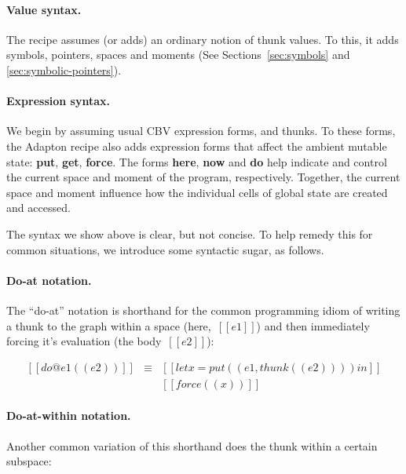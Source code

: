 \documentclass[11pt]{article}
\begin{document}
\paragraph{Value syntax.}
The recipe assumes (or adds) an ordinary notion of thunk values.
%
To this, it adds symbols, pointers, spaces and moments (See Sections~\ref{sec:symbols} and \ref{sec:symbolic-pointers}).

\ottgrammartabular{
  \ottv
}

\paragraph{Expression syntax.}

We begin by assuming usual CBV expression forms, and thunks.
%
To these forms, the Adapton recipe also adds expression forms that
affect the ambient mutable state: \textbf{put}, \textbf{get}, \textbf{force}.
%
The forms \textbf{here}, \textbf{now} and \textbf{do} help indicate
and control the current space and moment of the program, respectively.
%
Together, the current space and moment influence how the individual
cells of global state are created and accessed.

\ottgrammartabular{
  \otte
}

\ottgrammartabular{
  \ottC
  \\
  \ottCxtVerb
  \\
  \ottCxtDim
}

\noindent
The syntax we show above is clear, but not concise.
%
To help remedy this for common situations, we introduce some syntactic sugar, as follows.

\paragraph{Do-at notation.}

The ``do-at'' notation is shorthand for the common programming idiom
of writing a thunk to the graph within a space (here,~$[[e1]]$) and then
immediately forcing it's evaluation (the body~$[[e2]]$):

\[
\begin{array}{lcl}
  [[do @e1 ({( e2 )}) ]]
  &\equiv&
  [[let x = put((e1, thunk((e2)))) in]]
  \\
  &&[[force((x))]]
\end{array}
\]

\paragraph{Do-at-within notation.}
Another common variation of this shorthand does the thunk within a
certain subspace:
\end{document}
